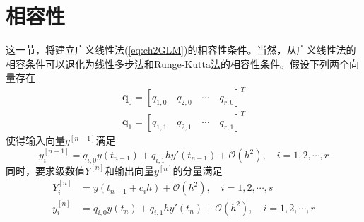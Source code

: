 \section{相容性}
这一节，将建立广义线性法(\ref{eq:ch2GLM})的相容性条件。当然，从广义线性法的相容条件可以退化为线性多步法和Runge-Kutta法的相容性条件。假设下列两个向量存在
\begin{align}
\bm{q}_0=[q_{1,0}\quad {q}_{2,0}\quad \cdots \quad{q}_{r,0}]^T\\
\bm{q}_1=[q_{1,1}\quad {q}_{2,1}\quad \cdots \quad{q}_{r,1}]^T
\end{align}
使得输入向量$y^{[n-1]}$满足
\begin{equation}
y_i^{[n-1]}=q_{i,0}y(t_{n-1})+q_{i,1}hy'(t_{n-1})+\mathcal{O}(h^2),\quad i=1,2,\cdots,r
\end{equation}
同时，要求级数值$Y^{[n]}$和输出向量$y^{[n]}$的分量满足
\begin{align}
Y^{[n]}_i&=y(t_{n-1}+c_ih)+\mathcal{O}(h^2),\quad i=1,2,\cdots,s\\
y_i^{[n]}&=q_{i,0}y(t_{n})+q_{i,1}hy'(t_{n})+\mathcal{O}(h^2),\quad i=1,2,\cdots,r
\end{align}

